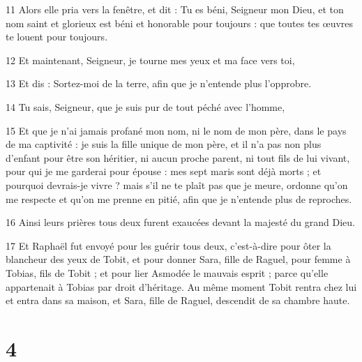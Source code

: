 \par 11 Alors elle pria vers la fenêtre, et dit : Tu es béni, Seigneur mon Dieu, et ton nom saint et glorieux est béni et honorable pour toujours : que toutes tes œuvres te louent pour toujours.
\par 12 Et maintenant, Seigneur, je tourne mes yeux et ma face vers toi,
\par 13 Et dis : Sortez-moi de la terre, afin que je n'entende plus l'opprobre.
\par 14 Tu sais, Seigneur, que je suis pur de tout péché avec l'homme,
\par 15 Et que je n'ai jamais profané mon nom, ni le nom de mon père, dans le pays de ma captivité : je suis la fille unique de mon père, et il n'a pas non plus d'enfant pour être son héritier, ni aucun proche parent, ni tout fils de lui vivant, pour qui je me garderai pour épouse : mes sept maris sont déjà morts ; et pourquoi devrais-je vivre ? mais s'il ne te plaît pas que je meure, ordonne qu'on me respecte et qu'on me prenne en pitié, afin que je n'entende plus de reproches.
\par 16 Ainsi leurs prières tous deux furent exaucées devant la majesté du grand Dieu.
\par 17 Et Raphaël fut envoyé pour les guérir tous deux, c'est-à-dire pour ôter la blancheur des yeux de Tobit, et pour donner Sara, fille de Raguel, pour femme à Tobias, fils de Tobit ; et pour lier Asmodée le mauvais esprit ; parce qu'elle appartenait à Tobias par droit d'héritage. Au même moment Tobit rentra chez lui et entra dans sa maison, et Sara, fille de Raguel, descendit de sa chambre haute.

\chapter{4}


